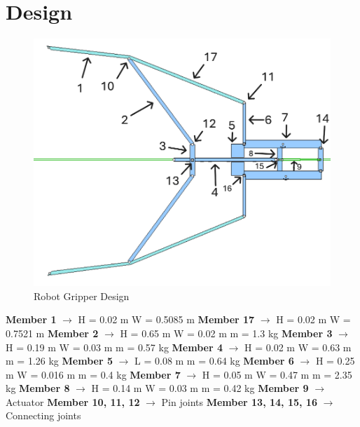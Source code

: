 \documentclass{article}
\begin{document}
\newpage
\section*{Design}

\begin{figure}[H]
    \centering
    \includegraphics[width=0.7\linewidth]{Images/Design.PNG}
    \caption{Robot Gripper Design}
\end{figure}
\textbf{Member 1} $\rightarrow$ H = 0.02 m \qquad W = 0.5085 m
\newline\newline
\textbf{Member 17} $\rightarrow$ H = 0.02 m \qquad W = 0.7521 m
\newline\newline
\textbf{Member 2} $\rightarrow$ H = 0.65 m \qquad W = 0.02 m \qquad m = 1.3 kg
\newline\newline
\textbf{Member 3} $\rightarrow$ H = 0.19 m \qquad W = 0.03 m \qquad m = 0.57 kg
\newline\newline
\textbf{Member 4} $\rightarrow$ H = 0.02 m \qquad W = 0.63 m \qquad m = 1.26 kg
\newline\newline
\textbf{Member 5} $\rightarrow$ L = 0.08 m \qquad m = 0.64 kg
\newline\newline
\textbf{Member 6} $\rightarrow$ H = 0.25 m \qquad W = 0.016 m \qquad m = 0.4 kg
\newline\newline
\textbf{Member 7} $\rightarrow$ H = 0.05 m \qquad W = 0.47 m \qquad m = 2.35 kg
\newline\newline
\textbf{Member 8} $\rightarrow$ H = 0.14 m \qquad W = 0.03 m \qquad m = 0.42 kg
\newline\newline
\textbf{Member 9} $\rightarrow$ Actuator
\newline\newline
\textbf{Member 10, 11, 12}  $\rightarrow$ Pin joints
\newline\newline
\textbf{Member 13, 14, 15, 16}  $\rightarrow$ Connecting joints
\end{document}
